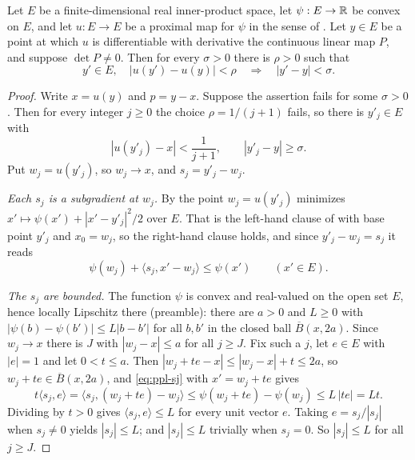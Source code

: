 \begin{lemma}
Let $E$ be a finite-dimensional real inner-product space, let $\psi:E\to\mathbb{R}$ be
convex on $E$, and let $u:E\to E$ be a proximal map for $\psi$ in the sense of
. Let $y\in E$ be a point at which $u$ is differentiable
with derivative the continuous linear map $P$, and suppose $\det P\ne0$. Then for
every $\sigma>0$ there is $\rho>0$ such that
\[
  y'\in E,\quad |u(y')-u(y)|<\rho\quad\Longrightarrow\quad |y'-y|<\sigma .
\]
\end{lemma}
\begin{proof}
Write $x=u(y)$ and $p=y-x$. Suppose the assertion fails for some $\sigma>0$.
Then for every integer $j\ge0$ the choice $\rho=1/(j+1)$ fails, so there is
$y'_j\in E$
with
\begin{equation}\label{eq:ppl-bad}
  |u(y'_j)-x|<\frac{1}{j+1},\qquad |y'_j-y|\ge\sigma .
\end{equation}
Put $w_j=u(y'_j)$, so $w_j\to x$, and $s_j=y'_j-w_j$.

\emph{Each $s_j$ is a subgradient at $w_j$.}
By  the point $w_j=u(y'_j)$ minimizes
$x'\mapsto\psi(x')+|x'-y'_j|^2/2$ over $E$. That is the left-hand clause of
 with base point $y'_j$ and $x_0=w_j$, so the
right-hand clause holds, and since $y'_j-w_j=s_j$ it reads
\begin{equation}\label{eq:ppl-sj}
  \psi(w_j)+\langle s_j,x'-w_j\rangle\le\psi(x')\qquad(x'\in E).
\end{equation}

\emph{The $s_j$ are bounded.}
The function $\psi$ is convex and real-valued on the open set $E$, hence locally
Lipschitz there (preamble): there are $a>0$ and $L\ge0$ with
$|\psi(b)-\psi(b')|\le L|b-b'|$ for all $b,b'$ in the closed ball
$\overline B(x,2a)$. Since $w_j\to x$ there is $J$ with $|w_j-x|\le a$ for all
$j\ge J$. Fix such a $j$, let $e\in E$ with $|e|=1$ and let $0<t\le a$. Then
$|w_j+te-x|\le|w_j-x|+t\le2a$, so $w_j+te\in\overline B(x,2a)$, and
\eqref{eq:ppl-sj} with $x'=w_j+te$ gives
\[
  t\langle s_j,e\rangle=\langle s_j,(w_j+te)-w_j\rangle
   \le\psi(w_j+te)-\psi(w_j)\le L\,|te|=Lt .
\]
Dividing by $t>0$ gives $\langle s_j,e\rangle\le L$ for every unit vector $e$.
Taking $e=s_j/|s_j|$ when $s_j\ne0$ yields $|s_j|\le L$; and $|s_j|\le L$
trivially when $s_j=0$. So $|s_j|\le L$ for all $j\ge J$.


\end{proof}
